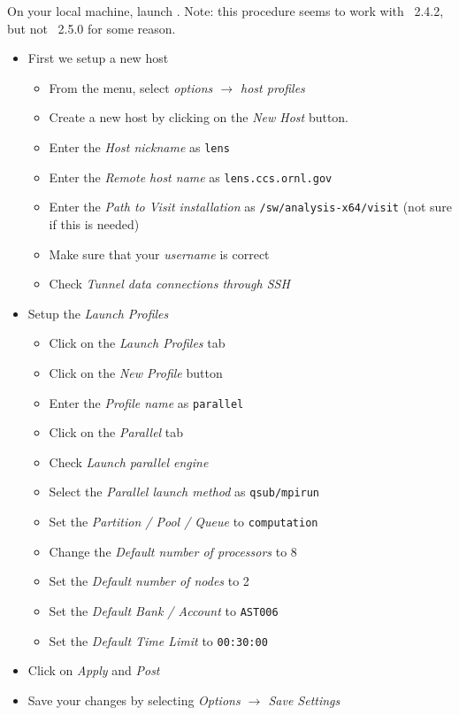 On your local machine, launch \visit.  Note: this procedure seems to
work with \visit~2.4.2, but not \visit~2.5.0 for some reason.
\begin{itemize}
\item First we setup a new host

  \begin{itemize}
  \item From the menu, select {\em options $\rightarrow$ host profiles}
  \item Create a new host by clicking on the {\em New Host} button.
  \item Enter the {\em Host nickname} as {\tt lens}
  \item Enter the {\em Remote host name} as {\tt lens.ccs.ornl.gov}
  \item Enter the {\em Path to Visit installation} as {\tt /sw/analysis-x64/visit} (not sure if this is needed)
  \item Make sure that your {\em username} is correct
  \item Check {\em Tunnel data connections through SSH}
  \end{itemize}

\item Setup the {\em Launch Profiles}
  \begin{itemize}
  \item Click on the {\em Launch Profiles} tab
  \item Click on the {\em New Profile} button
  \item Enter the {\em Profile name} as {\tt parallel}
  \item Click on the {\em Parallel} tab
  \item Check {\em Launch parallel engine}
  \item Select the {\em Parallel launch method} as {\tt qsub/mpirun}
  \item Set the {\em Partition / Pool / Queue} to {\tt computation}
  \item Change the {\em Default number of processors} to 8
  \item Set the {\em Default number of nodes} to 2
  \item Set the {\em Default Bank / Account} to {\tt AST006}
  \item Set the {\em Default Time Limit} to {\tt 00:30:00}
  \end{itemize}

\item Click on {\em Apply} and {\em Post}

\item Save your changes by selecting {\em Options $\rightarrow$ Save Settings}
\end{itemize}

